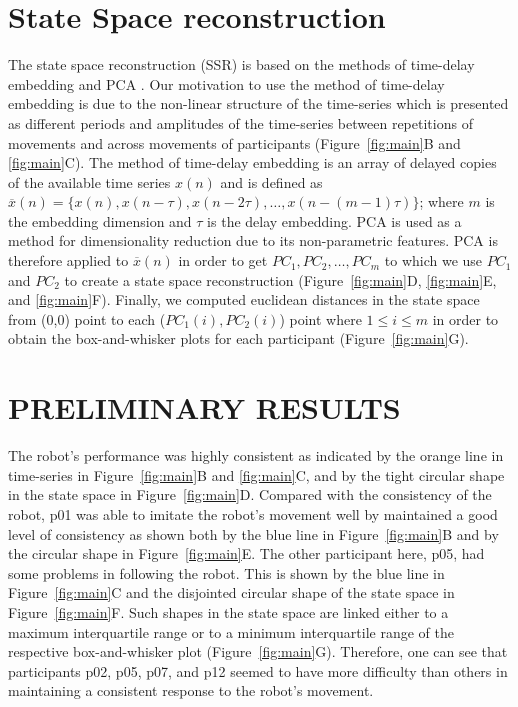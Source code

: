 \documentclass{sig-alternate-05-2015}
\begin{document}
\section{State Space reconstruction}

The state space reconstruction (SSR) is based on the methods of time-delay embedding and PCA \cite{Gibson1992}.
Our motivation to use the method of time-delay embedding
is due to the non-linear structure of the time-series
which is
presented
as
different periods and amplitudes of the time-series
between repetitions of movements and across movements of participants (Figure~\ref{fig:main}B and \ref{fig:main}C).
The method of time-delay embedding is an array of
delayed copies of the available time series $x(n)$ and is defined as
$ \overline{x}(n) = \{  x(n), x(n-\tau), x(n-2\tau), \dots,x(n-(m-1)\tau)\}$;
where $m$ is the embedding dimension and $\tau$ is the delay embedding.
PCA is used as a method for dimensionality reduction due to its non-parametric features.
PCA is therefore applied to $ \overline{x}(n)$ in order to get $PC_1, PC_2, \dots, PC_m$
to which we use $PC_1$ and $PC_2$
to create a state space reconstruction (Figure~\ref{fig:main}D, \ref{fig:main}E, and \ref{fig:main}F).
Finally, we computed euclidean distances in the state space
from (0,0) point to each ($PC_1(i),PC_2(i)$) point where $1 \leq i \leq m$
in order to obtain the box-and-whisker plots for each participant (Figure~\ref{fig:main}G).


\section{PRELIMINARY RESULTS}

The robot's performance was highly consistent
as indicated by the orange line in time-series in Figure~\ref{fig:main}B and \ref{fig:main}C,
and by the tight circular shape in the state space in Figure~\ref{fig:main}D.
Compared with the consistency of the robot,
p01 was able to imitate the robot's movement well by maintained a good level of consistency
as shown both
by the blue line in Figure~\ref{fig:main}B and
by the circular shape in Figure~\ref{fig:main}E.
The other participant here, p05, had some problems in following the robot.
This is shown by the blue line in
Figure~\ref{fig:main}C and the disjointed circular shape
of the  state space in Figure~\ref{fig:main}F.
Such shapes in the  state space are linked either
to a maximum interquartile range
or
to a minimum interquartile range of the respective box-and-whisker plot (Figure~\ref{fig:main}G).
Therefore, one  can see that participants p02, p05, p07, and p12 seemed
to have more difficulty than others in maintaining a consistent response
to the robot's movement.
\end{document}

